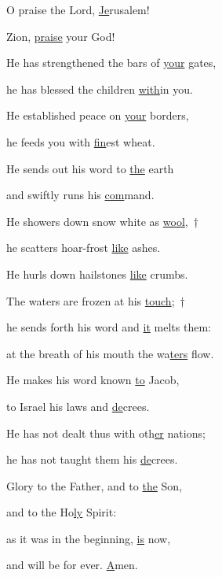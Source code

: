 \noindent O praise the Lord, \uline{Je}rusalem!~\GreStar{}~\nopagebreak

Zion, \uline{praise} your God!

\noindent He has strengthened the bars of \uline{your} gates,~\GreStar{}~\nopagebreak

he has blessed the children \uline{with}in you.

\noindent He established peace on \uline{your} borders,~\GreStar{}~\nopagebreak

he feeds you with \uline{fin}est wheat.

\noindent He sends out his word to \uline{the} earth~\GreStar{}~\nopagebreak

and swiftly runs his \uline{com}mand.

\noindent He showers down snow white as \uline{wool},~†~\nopagebreak

he scatters hoar-frost \uline{like} ashes.~\GreStar{}~\nopagebreak

He hurls down hailstones \uline{like} crumbs.

\noindent The waters are frozen at his \uline{touch};~†~\nopagebreak

he sends forth his word and \uline{it} melts them:~\GreStar{}~\nopagebreak

at the breath of his mouth the wa\uline{ters} flow.

\noindent He makes his word known \uline{to} Jacob,~\GreStar{}~\nopagebreak

to Israel his laws and \uline{de}crees.

\noindent He has not dealt thus with oth\uline{er} nations;~\GreStar{}~\nopagebreak

he has not taught them his \uline{de}crees.

\noindent Glory to the Father, and to \uline{the} Son,~\GreStar{}~\nopagebreak

and to the Ho\uline{ly} Spirit:

\noindent as it was in the beginning, \uline{is} now,~\GreStar{}~\nopagebreak

and will be for ever. \uline{A}men.
